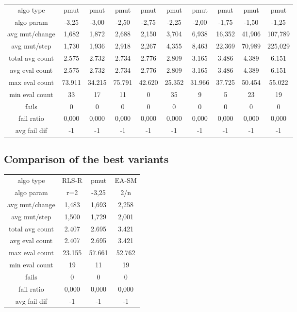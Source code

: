 \begin{tabular}[h]{cccccccccc}
algo type&           pmut&    pmut&    pmut&    pmut&    pmut&    pmut&    pmut&    pmut&    pmut\\
algo param&         -3,25&   -3,00&   -2,50&   -2,75&   -2,25&   -2,00&   -1,75&   -1,50&   -1,25\\
avg mut/change&     1,682&   1,872&   2,688&   2,150&   3,704&   6,938&  16,352&  41,906& 107,789\\
avg mut/step&       1,730&   1,936&   2,918&   2,267&   4,355&   8,463&  22,369&  70,989& 225,029\\
\hline
total avg count&    2.575&   2.732&   2.734&   2.776&   2.809&   3.165&   3.486&   4.389&   6.151\\
avg eval count&     2.575&   2.732&   2.734&   2.776&   2.809&   3.165&   3.486&   4.389&   6.151\\
max eval count&    73.911&  34.215&  75.791&  42.620&  25.352&  31.966&  37.725&  50.454&  55.022\\
min eval count&        33&      17&      11&       0&      35&       9&       5&      23&      19\\
\hline
fails&                  0&       0&       0&       0&       0&       0&       0&       0&       0\\
fail ratio&         0,000&   0,000&   0,000&   0,000&   0,000&   0,000&   0,000&   0,000&   0,000\\
avg fail dif&          -1&      -1&      -1&      -1&      -1&      -1&      -1&      -1&      -1\\
\end{tabular}


\subsection{Comparison of the best variants}


\begin{tabular}[h]{cccc}
algo type&         RLS-R&   pmut&  EA-SM\\
algo param&          r=2&  -3,25&    2/n\\
avg mut/change&    1,483&  1,693&  2,258\\
avg mut/step&      1,500&  1,729&  2,001\\
\hline
total avg count&   2.407&  2.695&  3.421\\
avg eval count&    2.407&  2.695&  3.421\\
max eval count&   23.155& 57.661& 52.762\\
min eval count&       19&     11&     19\\
\hline
fails&                 0&      0&      0\\
fail ratio&        0,000&  0,000&  0,000\\
avg fail dif&         -1&     -1&     -1\\
\end{tabular}

